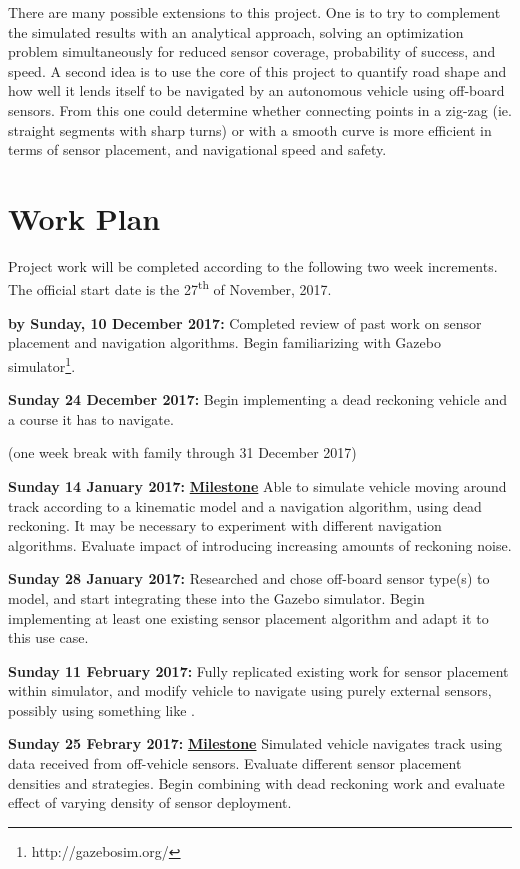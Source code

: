 \documentclass[12pt]{article}
\begin{document}
There are many possible extensions to this project. One is to try to complement the simulated results with an analytical approach, solving an optimization problem simultaneously for reduced sensor coverage, probability of success, and speed. A second idea is to use the core of this project to quantify road shape and how well it lends itself to be navigated by an autonomous vehicle using off-board sensors. From this one could determine whether connecting points in a zig-zag (ie. straight segments with sharp turns) or with a smooth curve is more efficient in terms of sensor placement, and navigational speed and safety.

\section{Work Plan}

Project work will be completed according to the following two week increments. The official start date is the 27\textsuperscript{th} of November, 2017.

\textbf{by Sunday, 10 December 2017:} Completed review of past work on sensor placement and navigation algorithms. Begin familiarizing with Gazebo simulator\footnote{http://gazebosim.org/}.

\textbf{Sunday 24 December 2017:} Begin implementing a dead reckoning vehicle and a course it has to navigate. 

(one week break with family through 31 December 2017)

\textbf{Sunday 14 January 2017:} \textbf{\underline{Milestone}} Able to simulate vehicle moving around track according to a kinematic model and a navigation algorithm, using dead reckoning. It may be necessary to experiment with different navigation algorithms. Evaluate impact of introducing increasing amounts of reckoning noise.

\textbf{Sunday 28 January 2017:} Researched and chose off-board sensor type(s) to model, and start integrating these into the Gazebo simulator. Begin implementing at least one existing sensor placement algorithm and adapt it to this use case. 

\textbf{Sunday 11 February 2017:} Fully replicated existing work for sensor placement within simulator, and modify vehicle to navigate using purely external sensors, possibly using something like \cite{yao2011distributed}.

\textbf{Sunday 25 Febrary 2017:} \textbf{\underline{Milestone}} Simulated vehicle navigates track using data received from off-vehicle sensors. Evaluate different sensor placement densities and strategies. Begin combining with dead reckoning work and evaluate effect of varying density of sensor deployment.
\end{document}
